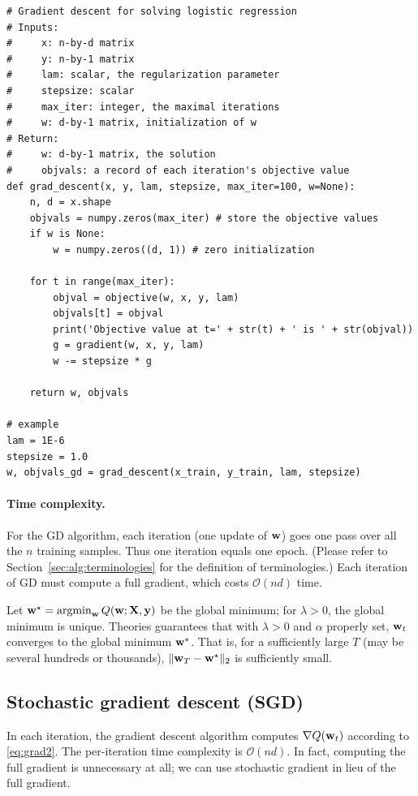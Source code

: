 \documentclass[11pt]{article}
\numberwithin{equation}{section}
\def\w{{\bf w}}
\def\X{{\bf X}}
\def\y{{\bf y}}
\def\OM{{\mathcal O}}
\def\argmin{\mathop{\rm argmin}}
\def\argmin{\mathop{\rm argmin}}
\begin{document}
\vspace{3mm}
\begin{lstlisting}
# Gradient descent for solving logistic regression
# Inputs:
#     x: n-by-d matrix
#     y: n-by-1 matrix
#     lam: scalar, the regularization parameter
#     stepsize: scalar
#     max_iter: integer, the maximal iterations
#     w: d-by-1 matrix, initialization of w
# Return:
#     w: d-by-1 matrix, the solution
#     objvals: a record of each iteration's objective value
def grad_descent(x, y, lam, stepsize, max_iter=100, w=None):
	n, d = x.shape
	objvals = numpy.zeros(max_iter) # store the objective values
	if w is None:
		w = numpy.zeros((d, 1)) # zero initialization
	
	for t in range(max_iter):
		objval = objective(w, x, y, lam)
		objvals[t] = objval
		print('Objective value at t=' + str(t) + ' is ' + str(objval))
		g = gradient(w, x, y, lam)
		w -= stepsize * g
	
	return w, objvals
	
# example
lam = 1E-6
stepsize = 1.0
w, objvals_gd = grad_descent(x_train, y_train, lam, stepsize)
\end{lstlisting}
\vspace{3mm}



\paragraph{Time complexity.}
For the GD algorithm,
each iteration (one update of $\w$) goes one pass over all the $n$ training samples.
Thus one iteration equals one epoch. 
(Please refer to Section~\ref{sec:alg:terminologies} for the definition of terminologies.)
Each iteration of GD must compute a full gradient, which costs $\OM (nd)$ time.


Let $\w^\star = \argmin_{\w} Q (\w ; \X , \y)$ be the global minimum;
for $\lambda >0$, the global minimum is unique.
Theories guarantees that with $\lambda > 0$ and $\alpha$ properly set,
$\w_t$ converges to the global minimum $\w^\star$.
That is, for a sufficiently large $T$ (may be several hundreds or thousands), 
$\| \w_T - \w^\star \|_2$ is sufficiently small.




\subsection{Stochastic gradient descent (SGD)} \label{sec:alg:sgd}

In each iteration, the gradient descent algorithm computes $ \nabla Q (\w_t)$ according to \eqref{eq:grad2}.
The per-iteration time complexity is $\OM (n d)$.
In fact, computing the full gradient is unnecessary at all;
we can use stochastic gradient in lieu of the full gradient.
\end{document}

